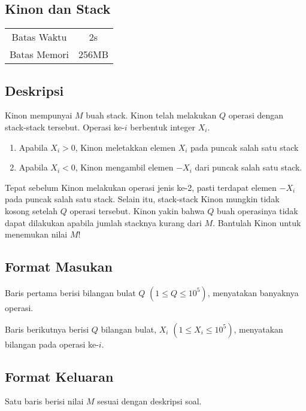 \documentclass{article}
\begin{document}
\begin{center}
    \section*{Kinon dan Stack} %

    \begin{tabular}{ | c c | }
        \hline
        Batas Waktu  & 2s \\    %
        Batas Memori & 256MB \\  %
        \hline
    \end{tabular}
\end{center}

\subsection*{Deskripsi}
Kinon mempunyai $M$ buah stack. Kinon telah melakukan $Q$ operasi dengan stack-stack tersebut. Operasi ke-$i$ berbentuk integer $X_i$.
\begin{enumerate}
\item Apabila $X_i>0$, Kinon meletakkan elemen $X_i$ pada puncak salah satu stack
\item Apabila $X_i<0$, Kinon mengambil elemen $-X_i$ dari puncak salah satu stack.
\end{enumerate}

Tepat sebelum Kinon melakukan operasi jenis ke-2, pasti terdapat elemen $-X_i$ pada puncak salah satu stack. Selain itu, stack-stack Kinon mungkin tidak kosong setelah $Q$ operasi tersebut.
Kinon yakin bahwa $Q$ buah operasinya tidak dapat dilakukan apabila jumlah stacknya kurang dari $M$. Bantulah Kinon untuk menemukan nilai $M$!

\subsection*{Format Masukan}
Baris pertama berisi bilangan bulat $Q$ $(1 \leq Q \leq 10^5)$, menyatakan banyaknya operasi.

Baris berikutnya berisi $Q$ bilangan bulat, $X_i$ $(1 \leq X_i \leq 10^5)$, menyatakan bilangan pada operasi ke-$i$.

\subsection*{Format Keluaran}
Satu baris berisi nilai $M$ sesuai dengan deskripsi soal.
\end{document}
